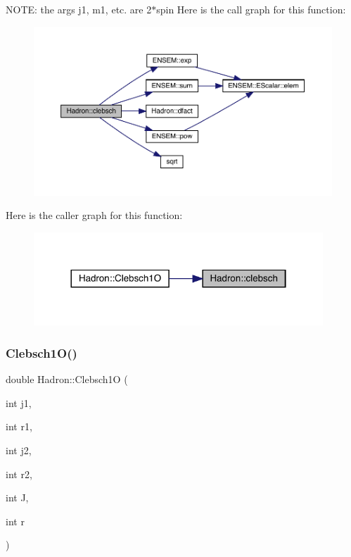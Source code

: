 N\+O\+TE\+: the args j1, m1, etc. are 2$\ast$spin Here is the call graph for this function\+:\nopagebreak
\begin{figure}[H]
\begin{center}
\leavevmode
\includegraphics[width=350pt]{d1/daf/namespaceHadron_ac4cba1d4aa3863fdc7991c208b3b9594_cgraph}
\end{center}
\end{figure}
Here is the caller graph for this function\+:\nopagebreak
\begin{figure}[H]
\begin{center}
\leavevmode
\includegraphics[width=308pt]{d1/daf/namespaceHadron_ac4cba1d4aa3863fdc7991c208b3b9594_icgraph}
\end{center}
\end{figure}
\mbox{\label{namespaceHadron_a78e0e843ad34636504d3ab3f2280e5e5}} 
\subsubsection{\texorpdfstring{Clebsch1O()}{Clebsch1O()}}
{\footnotesize\ttfamily double Hadron\+::\+Clebsch1O (\begin{DoxyParamCaption}\item[{int}]{j1,  }\item[{int}]{r1,  }\item[{int}]{j2,  }\item[{int}]{r2,  }\item[{int}]{J,  }\item[{int}]{r }\end{DoxyParamCaption})}



